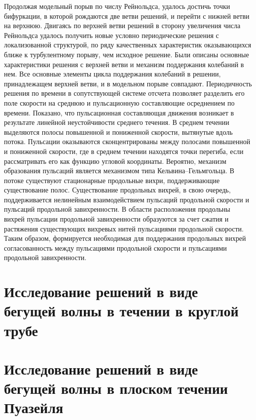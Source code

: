Продолжая модельный порыв по числу Рейнольдса, удалось достичь точки бифуркации, в которой рождаются две ветви решений, и перейти с нижней ветви на верхнюю. Двигаясь по верхней ветви решений в сторону увеличения числа Рейнольдса удалось получить новые условно периодические решения с локализованной структурой, по ряду качественных характеристик оказывающихся ближе к турбулентному порыву, чем исходное решение. Были описаны основные характеристики решения с верхней ветви и механизм поддержания колебаний в нем. Все основные элементы цикла поддержания колебаний в решении, принадлежащем верхней ветви, и в модельном порыве совпадают. Периодичность решения по времени в сопутствующей системе отсчета позволяет разделить его поле скорости на среднюю и пульсационную составляющие осреднением по времени. Показано, что пульсационная составляющая движения возникает в результате линейной неустойчивости среднего течения. В среднем течении выделяются полосы повышенной и пониженной скорости, вытянутые вдоль потока. Пульсации оказываются сконцентрированы между полосами повышенной и пониженной скорости, где в среднем течении находятся точки перегиба, если рассматривать его как функцию угловой координаты. Вероятно, механизм образования пульсаций является механизмом типа Кельвина--Гельмгольца. В потоке существуют стационарные продольные вихри, поддерживающие существование полос. Существование продольных вихрей, в свою очередь, поддерживается нелинейным взаимодействием пульсаций продольной скорости и пульсаций продольной завихренности. В области расположения продольны вихрей пульсации продольной завихренности образуются за счет сжатия и растяжения существующих вихревых нитей пульсациями продольной скорости. Таким образом, формируется необходимая для поддержания продольных вихрей согласованность между пульсациями продольной скорости и пульсациями продольной завихренности. 

\section{Исследование решений в виде бегущей волны в течении в круглой трубе}

\section{Исследование решений в виде бегущей волны в плоском течении Пуазейля}

